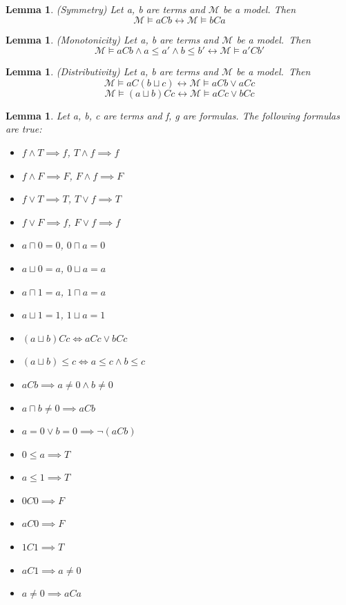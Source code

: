 \documentclass{article}
\newcommand\M{\mathcal{M}}
\newtheorem{lemma}[theorem]{Lemma}
\begin{document}
	\begin{lemma}
		(Symmetry) Let a, b are terms and $\M$ be a model. Then
		\begin{equation*}
			\M \models aCb \leftrightarrow \M \models bCa
		\end{equation*}
	\end{lemma}

	\begin{lemma}
		(Monotonicity) Let a, b are terms and $\M$ be a model.~Then
		\begin{equation*}
			\M \models aCb \land a \leq a' \land b \leq b' \leftrightarrow \M \models a'Cb'
		\end{equation*}
	\end{lemma}

	\begin{lemma}
		(Distributivity) Let a, b are terms and $\M$ be a model.~Then
		\begin{equation*}
			\M \models aC(b \sqcup c) \leftrightarrow \M \models aCb \lor aCc
		\end{equation*}
		\begin{equation*}
			\M \models (a \sqcup b)Cc \leftrightarrow \M \models aCc \lor bCc
		\end{equation*}
	\end{lemma}

	\begin{lemma}
		Let a, b, c are terms and f, g are formulas. The following formulas are true:
		\begin{itemize}
			\item $f \land T \implies f$, $T \land f \implies f$
			\item $f \land F \implies F$, $F \land f \implies F$
			\item $f \lor T \implies T$, $T \lor f \implies T$
			\item $f \lor F \implies f$, $F \lor f \implies f$
			\item $a \sqcap 0 = 0$, $0 \sqcap a = 0$
			\item $a \sqcup 0 = a$, $0 \sqcup a = a$
			\item $a \sqcap 1 = a$, $1 \sqcap a = a$
			\item $a \sqcup 1 = 1$, $1 \sqcup a = 1$
			\item $(a \sqcup b)Cc \iff aCc \lor bCc$
			\item $(a \sqcup b) \leq c \iff a \leq c \land b \leq c$
			\item $aCb \implies a \neq 0 \land b \neq 0$
			\item $a \sqcap b \neq 0 \implies aCb$
			\item $a = 0 \lor b = 0 \implies \neg(aCb)$
			\item $0 \leq a \implies T$
			\item $a \leq 1 \implies T$
			\item $0C0 \implies F$
			\item $aC0 \implies F$
			\item $1C1 \implies T$
			\item $aC1 \implies a \neq 0$
			\item $a \neq 0 \implies aCa$
		\end{itemize}
	\end{lemma}
\end{document}

